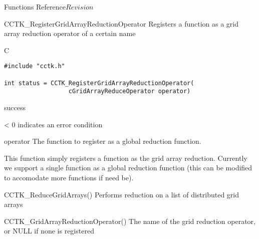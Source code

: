 \begin{cactuspart}{ Functions Reference}{}{$Revision$}
\begin{FunctionDescription}{CCTK\_RegisterGridArrayReductionOperator}
\label{CCTK-RegisterGridArrayReductionOperator}
Registers a function as a grid array reduction operator of a certain name

\begin{SynopsisSection}
\begin{Synopsis}{C}
\begin{verbatim}
#include "cctk.h"

int status = CCTK_RegisterGridArrayReductionOperator(
                  cGridArrayReduceOperator operator)
\end{verbatim}
\end{Synopsis}
\end{SynopsisSection}

\begin{ResultSection}
\begin{Result}{0} success \end{Result}
\begin{Result}{< 0} indicates an error condition \end{Result}
\end{ResultSection}

\begin{ParameterSection}
\begin{Parameter}{operator}
The function to register as a global reduction function.
\end{Parameter}
\end{ParameterSection}

\begin{Discussion}
This function simply registers a function as the grid array reduction. Currently
we support a single function as a global reduction function (this can be
modified to accomodate more functions if need be).
\end{Discussion}

\begin{SeeAlsoSection}
\begin{SeeAlso}{CCTK\_ReduceGridArrays()}
Performs reduction on a list of distributed grid arrays
\end{SeeAlso}

\begin{SeeAlso}{CCTK\_GridArrayReductionOperator()}
The name of the grid reduction operator, or NULL if none is registered
\end{SeeAlso}


\end{SeeAlsoSection}
\end{FunctionDescription}
\end{cactuspart}
